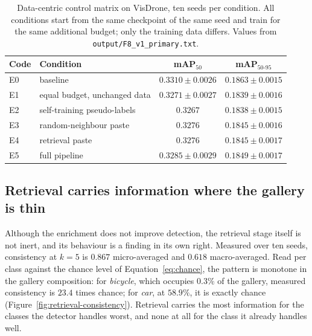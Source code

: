 \begin{table}[t]
\centering
\caption{Data-centric control matrix on VisDrone, ten seeds per condition. All conditions
start from the same checkpoint of the same seed and train for the same additional budget;
only the training data differs. Values from \texttt{output/F8\_v1\_primary.txt}.}
\label{tab:enrichment}
\begin{tabular}{llcc}
\toprule
Code & Condition & mAP$_{50}$ & mAP$_{50\text{-}95}$ \\
\midrule
E0 & baseline & $0.3310 \pm 0.0026$ & $0.1863 \pm 0.0015$ \\
E1 & equal budget, unchanged data & $0.3271 \pm 0.0027$ & $0.1839 \pm 0.0016$ \\
E2 & self-training pseudo-labels & $0.3267$ & $0.1838 \pm 0.0015$ \\
E3 & random-neighbour paste & $0.3276$ & $0.1845 \pm 0.0016$ \\
E4 & retrieval paste & $0.3276$ & $0.1845 \pm 0.0017$ \\
E5 & full pipeline & $0.3285 \pm 0.0029$ & $0.1849 \pm 0.0017$ \\
\bottomrule
\end{tabular}
\end{table}

\subsection{Retrieval carries information where the gallery is thin}
\label{sec:results:retrieval}

Although the enrichment does not improve detection, the retrieval stage itself is not
inert, and its behaviour is a finding in its own right. Measured over ten seeds,
consistency at $k = 5$ is $0.867$ micro-averaged and $0.618$ macro-averaged. Read per class
against the chance level of Equation~\eqref{eq:chance}, the pattern is monotone in the
gallery composition: for \emph{bicycle}, which occupies $0.3\%$ of the gallery, measured
consistency is $23.4$ times chance; for \emph{car}, at $58.9\%$, it is exactly chance
(Figure~\ref{fig:retrieval-consistency}). Retrieval carries the most information for the
classes the detector handles worst, and none at all for the class it already handles well.

